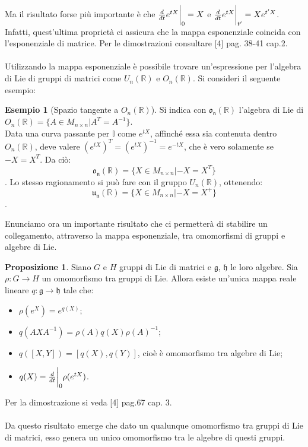 \documentclass[12pt,a4paper]{report}
\theoremstyle{definition}
\theoremstyle{Theorem}
\newtheorem{Prop}[Def]{Proposizione}
\theoremstyle{definition}
\newtheorem{Ex}[Def]{Esempio}
\theoremstyle{definition}
\theoremstyle{definition}
\begin{document}
Ma il risultato forse più importante è che ${d\over dt}e^{tX}\bigg{\rvert}_0=X$ e ${d\over dt}e^{tX}\bigg{\rvert}_{t'}=Xe^{t'X}$.\\
Infatti, quest'ultima proprietà ci assicura che la mappa esponenziale coincida con l'esponenziale di matrice.
Per le dimostrazioni consultare [4] pag. 38-41 cap.2.\\
\\
Utilizzando la mappa esponenziale è possibile trovare un'espressione per l'algebra di Lie di gruppi di matrici come $U_n(\mathbb{R})$ e $O_n(\mathbb{R})$. Si consideri il seguente esempio:
\begin{Ex}[Spazio tangente a $O_n(\mathbb{R})$]
	Si indica con $\mathfrak{o_n(\mathbb{R})}$ l'algebra di Lie di $O_n(\mathbb{R})=\{A\in M_{n\times n}|A^T=A^{-1}\}$.\\
	Data una curva passante per $\mathbb{I}$ come $e^{tX}$, affinché essa sia contenuta dentro $O_n(\mathbb{R})$, deve valere $(e^{tX})^T=(e^{tX})^{-1}=e^{-tX}$, che è vero solamente se $-X=X^T$. Da ciò: $$\mathfrak{o_n(\mathbb{R})}=\{X\in M_{n\times n}|-X=X^T\}$$.
	Lo stesso ragionamento si può fare con il gruppo $U_n(\mathbb{R})$, ottenendo: $$\mathfrak{u_n(\mathbb{R})}=\{X\in M_{n\times n}|-X=X^+\}$$.
\end{Ex}
Enunciamo ora un importante risultato che ci permetterà di stabilire un collegamento, attraverso la mappa esponenziale, tra omomorfismi di gruppi e algebre di Lie.
\begin{Prop} \label{Prop: 2.4.1}
	Siano $G$ e $H$ gruppi di Lie di matrici e $\mathfrak{g}$, $\mathfrak{h}$ le loro algebre. Sia $\rho:G\rightarrow H$ un omomorfismo tra gruppi di Lie. Allora esiste un'unica mappa reale lineare $q:\mathfrak{g}\rightarrow\mathfrak{h}$ tale che:
	\begin{itemize}
		\item $\rho(e^X)=e^{q(X)}$; 
		\item $q(AXA^{-1})=\rho(A)q(X)\rho(A)^{-1}$;
		\item $q([X,Y])=[q(X),q(Y)]$, cioè è omomorfismo tra algebre di Lie;
		\item $q(X)={d\over dt}\bigg{\rvert}_0\rho(e^{tX})$.
	\end{itemize}
\end{Prop}
Per la dimostrazione si veda [4] pag.67 cap. 3.\\
\\
Da questo risultato emerge che dato un qualunque omomorfismo tra gruppi di Lie di matrici, esso genera un unico omomorfismo tra le algebre di questi gruppi.
\end{document}
